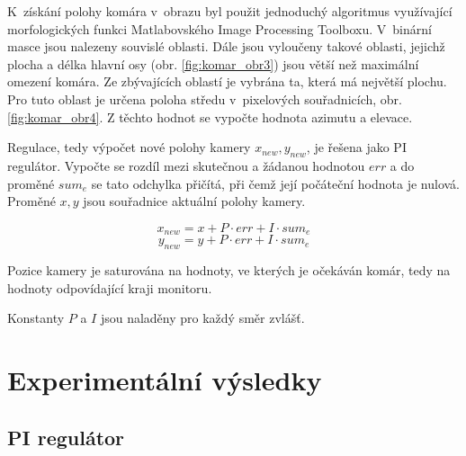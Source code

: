 \documentclass[a4paper,10pt]{article}
\begin{document}
		K~získání polohy komára v~obrazu byl použit jednoduchý algoritmus
		využíva\-jící morfologických funkci Matlabovského Image Processing Toolboxu. 
		V~binární masce jsou nalezeny souvislé oblasti.
		Dále jsou vyloučeny takové oblasti, 
		jejichž plocha a délka hlavní osy (obr. \ref{fig:komar_obr3}) jsou větší než maximální omezení komára.
		Ze zbývajících oblastí je vybrána ta, která má největší plochu. Pro tuto oblast je určena
		poloha středu v~pixelových souřadnicích, obr. \ref{fig:komar_obr4}.
		Z těchto hodnot se vypočte hodnota azimutu a elevace. 

	        Regulace, tedy výpočet nové polohy kamery $x_{new}, y_{new}$, je řešena jako PI
		regulátor. Vypočte se rozdíl mezi skutečnou a žádanou hodnotou $err$ a do
		proměné $sum_e$ se tato odchylka přičítá, při čemž její počáteční hodnota je
		nulová. Proměné $x, y$ jsou souřadnice aktuální polohy kamery.

		$$x_{new} = x + P\cdot err + I\cdot sum_e$$
		$$y_{new} = y + P\cdot err + I\cdot sum_e$$

		Pozice kamery je saturována na hodnoty, ve
		kterých je očekáván komár, tedy na hodnoty odpovídající kraji monitoru.

		Konstanty $P$ a $I$ jsou naladěny pro každý směr zvlášť.
		




\section{Experimentální výsledky}

\subsection{PI regulátor}
\end{document}
